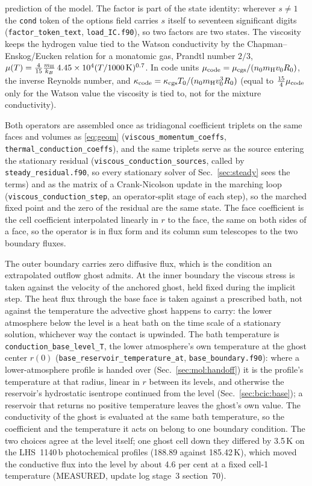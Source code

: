 prediction of the model.  The factor is part of the state identity: wherever
$s\ne1$ the \texttt{cond} token of the options field carries $s$ itself to
seventeen significant digits (\texttt{factor\_token\_text},
\texttt{load\_IC.f90}), so two factors are two states.  The viscosity keeps the hydrogen value tied
to the Watson conductivity by the Chapman--Enskog/Eucken relation for a
monatomic gas, Prandtl number $2/3$,
$\mu(T) = \frac{4}{15}\frac{m_{\rm H}}{k_B}\,4.45\times10^{4}(T/1000\,\mathrm{K})^{0.7}$.  In code units
$\mu_{\rm code} = \mu_{\rm cgs}/(n_0 m_{\rm H} v_0 R_0)$, the inverse Reynolds
number, and $\kappa_{\rm code} = \kappa_{\rm cgs}T_0/(n_0m_{\rm H}v_0^3R_0)$
(equal to $\tfrac{15}{4}\mu_{\rm code}$ only for the Watson value the
viscosity is tied to, not for the mixture conductivity).

Both operators are assembled once as tridiagonal coefficient triplets on the
same faces and volumes as \eqref{eq:geom} (\texttt{viscous\_momentum\_coeffs},
\texttt{thermal\_conduction\_coeffs}), and the same triplets serve as the
source entering the stationary residual (\texttt{viscous\_conduction\_sources},
called by \texttt{steady\_residual.f90}, so every stationary solver of
Sec.~\ref{sec:steady} sees the terms) and as the matrix of a Crank-Nicolson
update in the marching loop (\texttt{viscous\_conduction\_step}, an
operator-split stage of each step), so the marched fixed point and the zero
of the residual are the same state.  The face coefficient is the cell
coefficient interpolated linearly in $r$ to the face, the same on both sides
of a face, so the operator is in flux form and its column sum telescopes to
the two boundary fluxes.

The outer boundary carries zero diffusive flux, which is the condition an
extrapolated outflow ghost admits.  At the inner boundary the viscous stress
is taken against the velocity of the anchored ghost, held fixed during the
implicit step.  The heat flux through the base face is taken against a
prescribed bath, not against the temperature the advective ghost happens to
carry: the lower atmosphere below the level is a heat bath on the time scale
of a stationary solution, whichever way the contact is upwinded.  The bath
temperature is \texttt{conduction\_base\_level\_T}, the lower atmosphere's own
temperature at the ghost center $r(0)$ (\texttt{base\_reservoir\_temperature\_at},
\texttt{base\_boundary.f90}): where a lower-atmosphere profile is handed over
(Sec.~\ref{sec:mol:handoff}) it is the profile's temperature at that radius,
linear in $r$ between its levels, and otherwise the reservoir's hydrostatic
isentrope continued from the level (Sec.~\ref{sec:bcic:base}); a reservoir
that returns no positive temperature leaves the ghost's own value.  The
conductivity of the ghost is evaluated at the same bath temperature, so the
coefficient and the temperature it acts on belong to one boundary condition.
The two choices agree at the level itself; one ghost cell down they differed
by 3.5\,K on the LHS~1140\,b photochemical profiles (188.89 against
185.42\,K), which moved the conductive flux into the level by about 4.6 per
cent at a fixed cell-1 temperature (MEASURED, update log stage~3
section~70).

